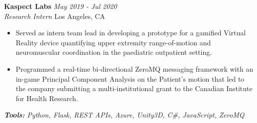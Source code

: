 \documentclass[letterpaper,10pt]{article}
\newcommand{\organization}[4]{
    \vspace{1.5pt}
    \textbf{#1} \hfill{\emph{#2}} \\
    \emph{#3} \hfill{#4} \\
    \vspace{3pt}
}
\newcommand{\toolsused}[1]{
    \vspace{1.5pt}
    \emph{#1}\\
    \vspace{3pt}
}
\newcommand{\bulletsBegin}{
    \vspace{1pt}
    \begin{minipage}{17.6cm}
    \begin{itemize}[leftmargin=0.6cm]
    \setlength\itemsep{-0.1em}
}
\newcommand{\bulletsEnd}{
    \end{itemize}\vspace{0pt}
    \end{minipage}
}
\begin{document}
        \organization{Kaspect Labs}{May 2019 - Jul 2020}
        {Research Intern}{Los Angeles, CA}
        \bulletsBegin
            \item Served as intern team lead in developing a prototype for a gamified Virtual Reality device quantifying upper extremity range-of-motion and neuromuscular coordination in the paediatric outpatient setting.
            \item Programmed a real-time bi-directional ZeroMQ messaging framework with an in-game Principal Component Analysis on the Patient’s motion that led to the company submitting a multi-institutional grant to the Canadian Institute for Health Research.
            \vspace{-2pt}
        \bulletsEnd
        \vspace{-4pt}
        \toolsused{\textbf{Tools:} Python, Flask, REST APIs, Azure, Unity3D, C\#, JavaScript, ZeroMQ}
        

\end{document}
